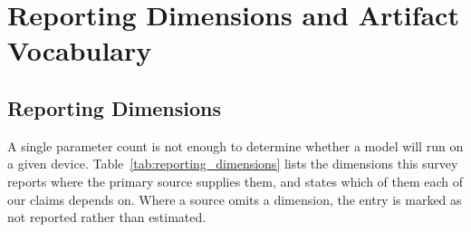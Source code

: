
\section{Reporting Dimensions and Artifact Vocabulary}
\label{supp:definitions}

\subsection{Reporting Dimensions}
\label{subsubsec:intro_def_dimensions}

A single parameter count is not enough to determine whether a model will run on a
given device. Table~\ref{tab:reporting_dimensions} lists the dimensions this
survey reports where the primary source supplies them, and states which of them
each of our claims depends on. Where a source omits a dimension, the entry is
marked as not reported rather than estimated.

\begin{table}[t]
\centering
\caption{Reporting dimensions for a small language model, the deployment question each answers, and the coverage achieved across the 209-variant inventory. ``Derived'' means the value follows arithmetically from others rather than being reported.}
\label{tab:reporting_dimensions}
\footnotesize{}
\end{table}

